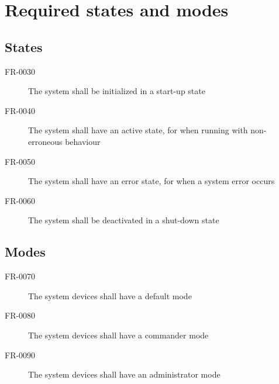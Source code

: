 \section{Required states and modes}

\subsection{States}
\begin{description}
  \item[FR-0030] The system shall be initialized in a start-up state
  \item[FR-0040] The system shall have an active state, for when running with non-erroneous behaviour
  \item[FR-0050] The system shall have an error state, for when a system error occurs
  \item[FR-0060] The system shall be deactivated in a shut-down state
\end{description}

\subsection{Modes}
\begin{description}
  \item[FR-0070] The system devices shall have a default mode
  \item[FR-0080] The system devices shall have a commander mode
  \item[FR-0090] The system devices shall have an administrator mode
\end{description}